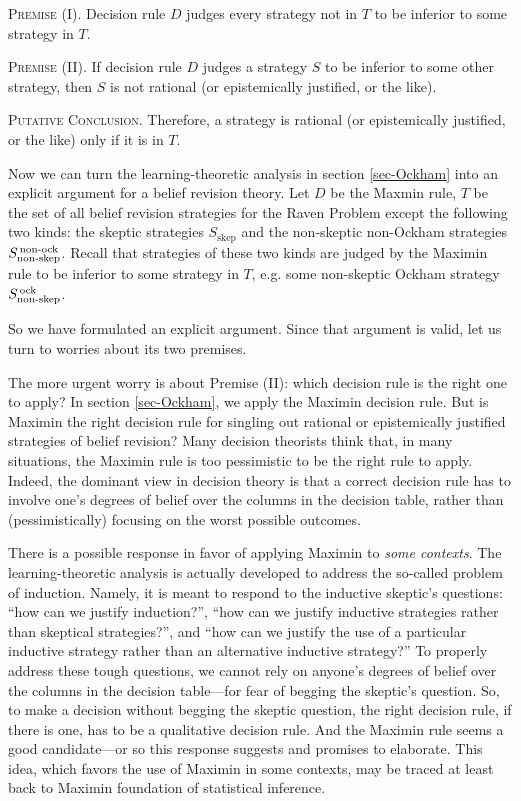 	\xm \textsc{Premise (I).} Decision rule $D$ judges every strategy not in $T$ to be inferior to some strategy in $T$.

	\xm \textsc{Premise (II).} If decision rule $D$ judges a strategy $S$ to be inferior to some other strategy, then $S$ is not rational (or epistemically justified, or the like).

	\xm \textsc{Putative Conclusion.} Therefore, a strategy is rational (or epistemically justified, or the like) only if it is in $T$.  

\ed Now we can turn the learning-theoretic analysis in section \ref{sec-Ockham} into an explicit argument for a belief revision theory. Let $D$ be the Maxmin rule, $T$ be the set of all belief revision strategies for the Raven Problem except the following two kinds: the skeptic strategies $S_{\textrm{skep}}$ and the non-skeptic non-Ockham strategies $S_{\textrm{non-skep}}^{\textrm{\,non-ock}}$. Recall that strategies of these two kinds are judged by the Maximin rule to be inferior to some strategy in ${T}$, e.g. some non-skeptic Ockham strategy $S_{\textrm{non-skep}}^{\textrm{\,ock}}$.

So we have formulated an explicit argument. Since that argument is valid, let us turn to worries about its two premises.

The more urgent worry is about Premise (II): which decision rule is the right one to apply? In section \ref{sec-Ockham}, we apply the Maximin decision rule. But is Maximin the right decision rule for singling out rational or epistemically justified strategies of belief revision? Many decision theorists think that, in many situations, the Maximin rule is too pessimistic to be the right rule to apply. Indeed, the dominant view in decision theory is that a correct decision rule has to involve one's degrees of belief over the columns in the decision table, rather than (pessimistically) focusing on the worst possible outcomes.

There is a possible response in favor of applying Maximin to {\em some contexts}. The learning-theoretic analysis is actually developed to address the so-called problem of induction. Namely, it is meant to respond to the inductive skeptic's questions: ``how can we justify induction?'', ``how can we justify inductive strategies rather than skeptical strategies?'', and ``how can we justify the use of a particular inductive strategy rather than an alternative inductive strategy?'' To properly address these tough questions, we cannot rely on anyone's degrees of belief over the columns in the decision table---for fear of begging the skeptic's question. So, to make a decision without begging the skeptic question, the right decision rule, if there is one, has to be a qualitative decision rule. And the Maximin rule seems a good candidate---or so this response suggests and promises to elaborate. This idea, which favors the use of Maximin in some contexts, may be traced at least back to  Maximin foundation of statistical inference.


